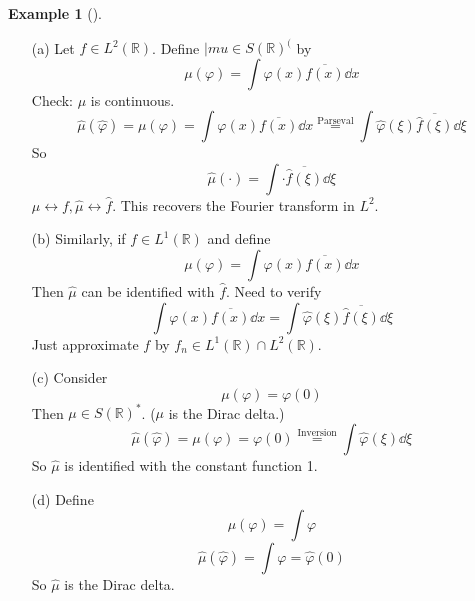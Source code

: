 \documentclass{article}
\theoremstyle{definition}
\newtheorem{ex}{Example}
\newenvironment{exs}[1][]{%
  \begin{ex}[#1]$ $\par\nobreak\ignorespaces
}{%
  \end{ex}
}
\newcommand{\RR}{\mathbb R}
\begin{document}
\begin{exs}
	\begin{enumerate}
		\item[(a)] Let $f \in L^2(\RR)$.
			Define $|mu \in S(\RR)^($ by 
			\[
				\mu(\varphi) = \int \varphi(x) \overline{f(x)} \dd{x}
			\]
			Check: $\mu$ is continuous.
			\[
				\widehat{\mu}(\widehat{\varphi}) = \mu(\varphi) = \int \varphi(x) \overline{f(x)} \dd{x} \stackrel{\text{Parseval}}{=} \int \widehat{\varphi}(\xi) \overline{\widehat{f}(\xi)} \dd{\xi}
			\]
			So 
			\[
				\widehat{\mu}(\cdot) = \int \cdot \overline{\widehat{f}(\xi)} \dd{\xi}
			\]
			$\mu \leftrightarrow f, \widehat{\mu} \leftrightarrow \widehat{f}$.
			This recovers the Fourier transform in $L^2$.

		\item[(b)] Similarly, if $f \in L^1(\RR)$ and define 
			\[
				\mu(\varphi) = \int \varphi(x) \overline{f(x)} \dd{x}
			\]
			Then $\widehat{\mu}$ can be identified with $\widehat{f}$.
			Need to verify
			\[
				\int \varphi(x) \overline{f(x)} \dd{x} = \int \widehat{\varphi}(\xi) \overline{\widehat{f}(\xi)} \dd{\xi}
			\]
			Just approximate $f$ by $f_n \in L^1(\RR) \cap L^2(\RR)$.
			
		\item[(c)] Consider 
			\[
				\mu(\varphi) = \varphi(0)
			\]
			Then $\mu \in S(\RR)^*$. 
			($\mu$ is the Dirac delta.)
			\[
				\widehat{\mu}(\widehat{\varphi}) = \mu(\varphi) = \varphi(0) \stackrel{\text{Inversion}}{=} \int \widehat{\varphi}(\xi) \dd{\xi}
			\]
			So $\widehat{\mu}$ is identified with the constant function 1.

		\item[(d)] Define 
			\[
				\mu(\varphi) = \int \varphi
			\]
			\[
				\widehat{\mu}(\widehat{\varphi}) = \int \varphi = \widehat{\varphi}(0)
			\]
			So $\widehat{\mu}$ is the Dirac delta.
	\end{enumerate}
\end{exs}
\end{document}
